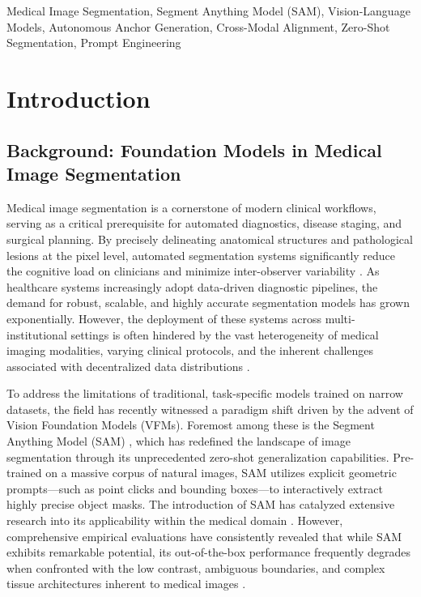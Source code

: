 \documentclass[onecolumn]{IEEEtran}
\numberwithin{equation}{section}
\theoremstyle{definition}
\theoremstyle{remark}
\begin{document}
\begin{IEEEkeywords}
Medical Image Segmentation, Segment Anything Model (SAM), Vision-Language Models, Autonomous Anchor Generation, Cross-Modal Alignment, Zero-Shot Segmentation, Prompt Engineering
\end{IEEEkeywords}

\section{Introduction}

\subsection{Background: Foundation Models in Medical Image Segmentation}

Medical image segmentation is a cornerstone of modern clinical workflows, serving as a critical prerequisite for automated diagnostics, disease staging, and surgical planning. By precisely delineating anatomical structures and pathological lesions at the pixel level, automated segmentation systems significantly reduce the cognitive load on clinicians and minimize inter-observer variability \cite{defauw2018clinically}. As healthcare systems increasingly adopt data-driven diagnostic pipelines, the demand for robust, scalable, and highly accurate segmentation models has grown exponentially. However, the deployment of these systems across multi-institutional settings is often hindered by the vast heterogeneity of medical imaging modalities, varying clinical protocols, and the inherent challenges associated with decentralized data distributions \cite{sheller2019multi}.

To address the limitations of traditional, task-specific models trained on narrow datasets, the field has recently witnessed a paradigm shift driven by the advent of Vision Foundation Models (VFMs). Foremost among these is the Segment Anything Model (SAM) \cite{kirillov2023segment}, which has redefined the landscape of image segmentation through its unprecedented zero-shot generalization capabilities. Pre-trained on a massive corpus of natural images, SAM utilizes explicit geometric prompts—such as point clicks and bounding boxes—to interactively extract highly precise object masks. The introduction of SAM has catalyzed extensive research into its applicability within the medical domain \cite{ma2024segment}. However, comprehensive empirical evaluations have consistently revealed that while SAM exhibits remarkable potential, its out-of-the-box performance frequently degrades when confronted with the low contrast, ambiguous boundaries, and complex tissue architectures inherent to medical images \cite{mazurowski2023segment, huang2024segment}.
\end{document}
